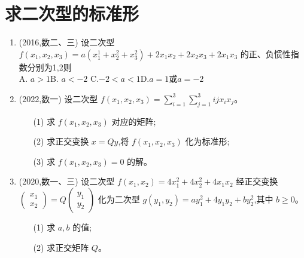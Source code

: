\documentclass[12pt, a4paper, oneside, UTF8]{ctexbook}
\begin{document}
\section{求二次型的标准形}

\begin{enumerate}[label=\arabic*.]
    \item (2016,数二、三) 设二次型 $ f(x_1, x_2, x_3) = a(x^1_1+x^2_2+x_3^2)+
    2x_1x_2+2x_2x_3+2x_1x_3$ 的正、负惯性指数分别为1,2则 \\
    A. $a > 1$\qquad B. $a < -2$ \qquad C.$-2<a<1$\qquad D.$a=1$或$a=-2$ 
    
    \begin{solution}
    \newpage
    \end{solution}
    
    \item (2022,数一) 设二次型 $ f(x_1, x_2, x_3) = 
    \displaystyle \sum_{i=1}^3 \sum_{j=1}^3 i j x_i x_j $。
    \begin{enumerate}
        \item [(1)] 求 $ f(x_1, x_2, x_3) $ 对应的矩阵;
        \item [(2)] 求正交变换 $ x = Q y $,将 $ f(x_1, x_2, x_3) $ 化为标准形;
        \item [(3)] 求 $ f(x_1, x_2, x_3) = 0 $ 的解。
    \end{enumerate}
    
    \begin{solution}
    \newpage
    \end{solution}
    
    \item (2020,数一、三) 设二次型 $ f(x_1, x_2) = 4 x_1^2 + 4 x_2^2 + 4 x_1 x_2 $
    经正交变换 $ \begin{pmatrix} x_1 \\ x_2 \end{pmatrix} = Q \begin{pmatrix} y_1 \\ y_2 
    \end{pmatrix} $ 化为二次型 $ g(y_1, y_2) = ay_1^2 + 4y_1y_2 + b y_2^2 $,其中 $ b \geq 0 $。 
    \begin{enumerate}
        \item [(1)] 求 $ a, b $ 的值;
        \item [(2)] 求正交矩阵 $ Q $。
    \end{enumerate}
    
    \begin{solution}
    \newpage
    \end{solution}
\end{enumerate}
\end{document}
